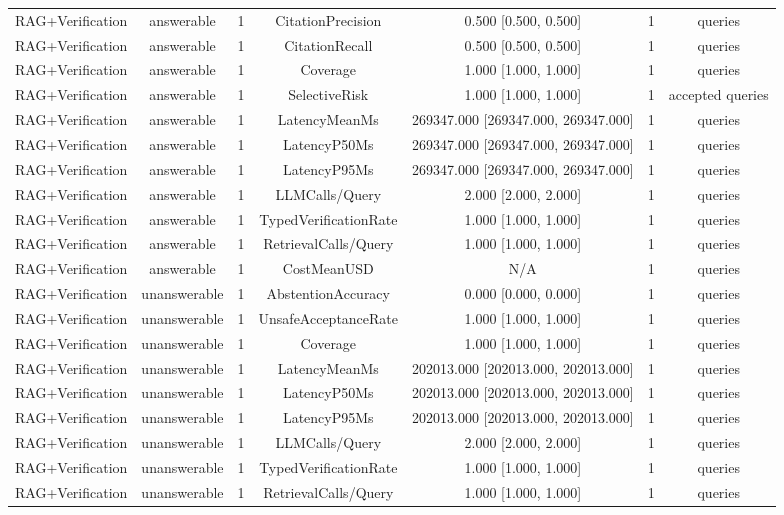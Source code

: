 {\begin{tabular}{lcccccc}
RAG+Verification & answerable & 1 & CitationPrecision & 0.500 [0.500, 0.500] & 1 & queries \\
RAG+Verification & answerable & 1 & CitationRecall & 0.500 [0.500, 0.500] & 1 & queries \\
RAG+Verification & answerable & 1 & Coverage & 1.000 [1.000, 1.000] & 1 & queries \\
RAG+Verification & answerable & 1 & SelectiveRisk & 1.000 [1.000, 1.000] & 1 & accepted queries \\
RAG+Verification & answerable & 1 & LatencyMeanMs & 269347.000 [269347.000, 269347.000] & 1 & queries \\
RAG+Verification & answerable & 1 & LatencyP50Ms & 269347.000 [269347.000, 269347.000] & 1 & queries \\
RAG+Verification & answerable & 1 & LatencyP95Ms & 269347.000 [269347.000, 269347.000] & 1 & queries \\
RAG+Verification & answerable & 1 & LLMCalls/Query & 2.000 [2.000, 2.000] & 1 & queries \\
RAG+Verification & answerable & 1 & TypedVerificationRate & 1.000 [1.000, 1.000] & 1 & queries \\
RAG+Verification & answerable & 1 & RetrievalCalls/Query & 1.000 [1.000, 1.000] & 1 & queries \\
RAG+Verification & answerable & 1 & CostMeanUSD & N/A & 1 & queries \\
RAG+Verification & unanswerable & 1 & AbstentionAccuracy & 0.000 [0.000, 0.000] & 1 & queries \\
RAG+Verification & unanswerable & 1 & UnsafeAcceptanceRate & 1.000 [1.000, 1.000] & 1 & queries \\
RAG+Verification & unanswerable & 1 & Coverage & 1.000 [1.000, 1.000] & 1 & queries \\
RAG+Verification & unanswerable & 1 & LatencyMeanMs & 202013.000 [202013.000, 202013.000] & 1 & queries \\
RAG+Verification & unanswerable & 1 & LatencyP50Ms & 202013.000 [202013.000, 202013.000] & 1 & queries \\
RAG+Verification & unanswerable & 1 & LatencyP95Ms & 202013.000 [202013.000, 202013.000] & 1 & queries \\
RAG+Verification & unanswerable & 1 & LLMCalls/Query & 2.000 [2.000, 2.000] & 1 & queries \\
RAG+Verification & unanswerable & 1 & TypedVerificationRate & 1.000 [1.000, 1.000] & 1 & queries \\
RAG+Verification & unanswerable & 1 & RetrievalCalls/Query & 1.000 [1.000, 1.000] & 1 & queries \\

\end{tabular}}
